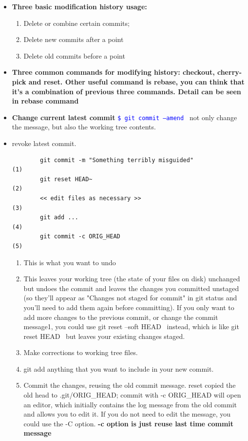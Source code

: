 \documentclass[a4paper,11pt,twoside]{book}
\newcommand{\linuxcommand}[1]{\texttt{\textcolor{blue}{\$ #1 \Pisymbol{psy}{191}}}}
\begin{document}
\begin{itemize}
	\item \textbf{Three basic modification history usage:}
	\begin{enumerate}
		\item Delete or combine certain commits;
		\item Delete new commits after a point
		\item Delete old commits before a point
	\end{enumerate}
	
	\item \textbf{Three common commands for modifying history: checkout, cherry-pick and reset. Other useful command is rebase, you can think that it's a combination of previous three commands. Detail can be seen in rebase command}
	
	\item \textbf{Change current latest commit} \linuxcommand{git commit  --amend} not only change the message, but also the working tree contents. 
	
	\item revoke latest commit.
	\begin{verbatim}
		git commit -m "Something terribly misguided"              (1)
		git reset HEAD~                                           (2)
		<< edit files as necessary >>                             (3)
		git add ...                                               (4)
		git commit -c ORIG_HEAD                                   (5)
	\end{verbatim}
	\begin{enumerate}
		\item This is what you want to undo
		\item This leaves your working tree (the state of your files on disk) unchanged but undoes the commit and leaves the changes you committed unstaged (so they'll appear as "Changes not staged for commit" in git status and you'll need to add them again before committing). If you only want to add more changes to the previous commit, or change the commit message1, you could use git reset --soft HEAD~ instead, which is like git reset HEAD~ but leaves your existing changes staged.
		\item Make corrections to working tree files.
		\item git add anything that you want to include in your new commit.
		\item Commit the changes, reusing the old commit message. reset copied the old head to .git/ORIG\_HEAD; commit with -c ORIG\_HEAD will open an editor, which initially contains the log message from the old commit and allows you to edit it. If you do not need to edit the message, you could use the -C option.  \textbf{-c option is just reuse last time commit message}
	\end{enumerate}
	

\end{itemize}
\end{document}
